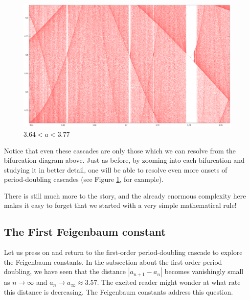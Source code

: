 \documentclass[twocolumn,amsmath,amssymb,aps]{revtex4}
\begin{document}
\begin{figure}[!htb]
	\centering
	\includegraphics[scale=0.18]{odd_period_2}
	\caption{$3.64 < a < 3.77$}
	\label{fig:odd_period_2}
\end{figure}


Notice that even these cascades are only those which we can resolve from the bifurcation diagram above. Just as before, by zooming into each bifurcation and studying it in better detail, one will be able to resolve even more onsets of period-doubling cascades (see Figure \ref{fig:odd_period_2}, for example).

There is still much more to the story, and the already enormous complexity here makes it easy to forget that we started with a very simple mathematical rule! 




\subsection{The First Feigenbaum constant}

Let us press on and return to the first-order period-doubling cascade to explore the Feigenbaum constants. In the subsection about the first-order period-doubling, we have seen that the distance $|a_{n+1} - a_n|$ becomes vanishingly small as $n\to \infty$ and $a_n \to a_\infty \approx 3.57$. The excited reader might wonder at what rate this distance is decreasing. The Feigenbaum constants address this question. 
\end{document}

